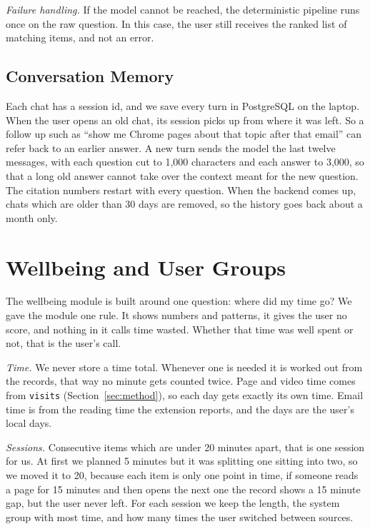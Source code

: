 \documentclass[conference]{IEEEtran}
\begin{document}
\textit{Failure handling.} If the model cannot be reached, the deterministic pipeline runs once on the raw question. In this case, the user still receives the ranked list of matching items, and not an error.

\subsection{Conversation Memory}
Each chat has a session id, and we save every turn in PostgreSQL on the laptop. When the user opens an old chat, its session picks up from where it was left. So a follow up such as ``show me Chrome pages about that topic after that email'' can refer back to an earlier answer. A new turn sends the model the last twelve messages, with each question cut to 1,000 characters and each answer to 3,000, so that a long old answer cannot take over the context meant for the new question. The citation numbers restart with every question. When the backend comes up, chats which are older than 30 days are removed, so the history goes back about a month only.

\section{Wellbeing and User Groups}\label{sec:wba}
The wellbeing module is built around one question: where did my time go? We gave the module one rule. It shows numbers and patterns, it gives the user no score, and nothing in it calls time wasted. Whether that time was well spent or not, that is the user's call.

\textit{Time.} We never store a time total. Whenever one is needed it is worked out from the records, that way no minute gets counted twice. Page and video time comes from \texttt{visits} (Section~\ref{sec:method}), so each day gets exactly its own time. Email time is from the reading time the extension reports, and the days are the user's local days.

\textit{Sessions.} Consecutive items which are under 20 minutes apart, that is one session for us. At first we planned 5 minutes but it was splitting one sitting into two, so we moved it to 20, because each item is only one point in time, if someone reads a page for 15 minutes and then opens the next one the record shows a 15 minute gap, but the user never left. For each session we keep the length, the system group with most time, and how many times the user switched between sources.
\end{document}
